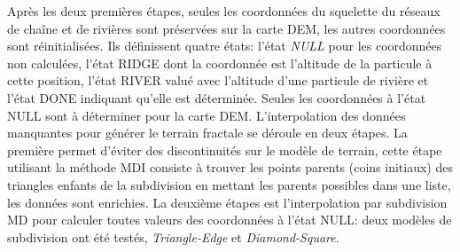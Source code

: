 \documentclass[11pt]{report}
\begin{document}
Après les deux premières étapes, seules les coordonnées du squelette du réseaux de chaîne et de rivières sont préservées sur la carte DEM, les autres coordonnées sont réinitialisées. Ils définissent quatre états: l'état \textit{NULL} pour les coordonnées non calculées, l'état RIDGE dont la coordonnée est l'altitude de la particule à cette position, l'état RIVER valué avec l'altitude d'une particule de rivière et l'état DONE indiquant qu'elle est déterminée. Seules les coordonnées à l'état NULL sont à déterminer pour la carte DEM. L'interpolation des données manquantes pour générer le terrain fractale se déroule en deux étapes. La première permet d'éviter des discontinuités sur le modèle de terrain, cette étape utilisant la méthode MDI consiste à trouver les points parents (coins initiaux) des triangles enfants de la subdivision en mettant les parents possibles dans une liste, les données sont enrichies. La deuxième étapes est l'interpolation par subdivision MD pour calculer toutes valeurs des coordonnées à l'état NULL: deux modèles de subdivision ont été testés, \textit{Triangle-Edge} et \textit{Diamond-Square}. 
\end{document}
